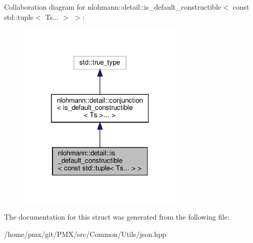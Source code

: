 Collaboration diagram for nlohmann\+:\+:detail\+:\+:is\+\_\+default\+\_\+constructible$<$ const std\+:\+:tuple$<$ Ts... $>$ $>$\+:
\nopagebreak
\begin{figure}[H]
\begin{center}
\leavevmode
\includegraphics[width=223pt]{structnlohmann_1_1detail_1_1is__default__constructible_3_01const_01std_1_1tuple_3_01Ts_8_8_8_01_4_01_4__coll__graph}
\end{center}
\end{figure}


The documentation for this struct was generated from the following file\+:\begin{DoxyCompactItemize}
\item 
/home/pmx/git/\+P\+M\+X/src/\+Common/\+Utils/json.\+hpp\end{DoxyCompactItemize}
